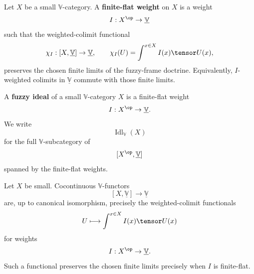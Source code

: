 \begin{definition}
\label{def:finite-flat-weight}
Let \(X\) be a small \(\mathbb V\)-category.  A \textbf{finite-flat weight} on
\(X\) is a weight
\[
    I:X^{\op}\to\underline{\mathbb V}
\]
such that the weighted-colimit functional
\[
    \chi_I:[X,\underline{\mathbb V}]\to\underline{\mathbb V},
    \qquad
    \chi_I(U)=\int^{x\in X} I(x)\tensor U(x),
\]
preserves the chosen finite limits of the fuzzy-frame doctrine.  Equivalently,
\(I\)-weighted colimits in \(\underline{\mathbb V}\) commute with those finite
limits.
\end{definition}

\begin{definition}
\label{def:fuzzy-ideal-enriched}
A \textbf{fuzzy ideal} of a small \(\mathbb V\)-category \(X\) is a finite-flat
weight
\[
    I:X^{\op}\to\underline{\mathbb V}.
\]
We write
\[
    \operatorname{Idl}_{\mathbb V}(X)
\]
for the full \(\mathbb V\)-subcategory of
\[
    [X^{\op},\underline{\mathbb V}]
\]
spanned by the finite-flat weights.
\end{definition}

\begin{proposition}
\label{prop:flat-weight-representation-of-characters}
Let \(X\) be small.  Cocontinuous \(\mathbb V\)-functors
\[
    [X,\underline{\mathbb V}]\to\underline{\mathbb V}
\]
are, up to canonical isomorphism, precisely the weighted-colimit functionals
\[
    U\longmapsto \int^{x\in X} I(x)\tensor U(x)
\]
for weights
\[
    I:X^{\op}\to\underline{\mathbb V}.
\]
Such a functional preserves the chosen finite limits precisely when \(I\) is
finite-flat.
\end{proposition}

